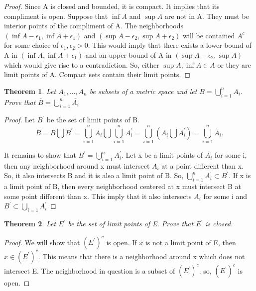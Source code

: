 \documentclass{article}
\theoremstyle{plain}
\newtheorem{theorem}{Theorem}
\theoremstyle{definition}
\begin{document}
\begin{proof}
	Since A is closed and bounded, it is compact. It implies that its compliment is open. Suppose that $\inf A$ and $\sup A$ are not in A. They must be interior points of the compliment of A. The neighborhoods $(\inf A - \epsilon_{1}, \inf A + \epsilon_{1})$ and $(\sup A - \epsilon_{2}, \sup A + \epsilon_{2})$ will be contained $A^{c}$ for some choice of $\epsilon_{1},\epsilon_{2} > 0$. This would imply that there exists a lower bound of A in $(\inf A, \inf A + \epsilon_{1})$ and an upper bound of A in $(\sup A - \epsilon_{2}, \sup A)$ which would give rise to a contradiction. So, either $\sup A, \inf A \in A$ or they are limit points of A. Compact sets contain their limit points.
\end{proof}

\begin{theorem}
	Let $A_{1},...,A_{n}$ be subsets of a metric space and let $B = \bigcup_{i = 1}^{n} A_{i}$. Prove that $\bar{B}= \bigcup_{i = 1}^{n} \bar{A_{i}}$
\end{theorem}

\begin{proof}
	Let $B^{'}$ be the set of limit points of B. $$\bar{B} = B \bigcup B^{'} = \bigcup_{i = 1}^{n} A_{i} \bigcup \bigcup_{i = 1}^{n} A_{i}^{'} = \bigcup_{i = 1}^{n} (A_{i} \bigcup A_{i}^{'}) = \bigcup_{i = 1}^{n} \bar{A_{i}}. $$
	
	It remains to show that $B^{'} = \bigcup_{i = 1}^{n} A_{i}^{'}$. Let x be a limit points of $A_{i}$ for some i, then any neighborhood around x must intersect $A_{i}$ at a point different than x. So, it also intersects B and it is also a limit point of B. So, $\bigcup_{i = 1}^{n} A_{i}^{'} \subset B^{'}$. If x is a limit point of B, then every neighborhood centered at x must intersect B at some point different than x. This imply that it also intersects $A_{i}$ for some i and $B^{'} \subset \bigcup_{i = 1} A_{i}^{'}$
\end{proof}
\begin{theorem}
	Let $E^{'}$ be the set of limit points of E. Prove that $E^{'}$ is closed.
\end{theorem}
\begin{proof}
	We will show that $(E^{'})^{c}$ is open. If $x$ is not a limit point of E, then $x \in (E^{'})^{c}$. This means that there is a neighborhood around x which does not intersect E. The neighborhood in question is a subset of $(E^{'})^{c}$. so, $(E^{'})^{c}$ is open.
\end{proof}
\end{document}
